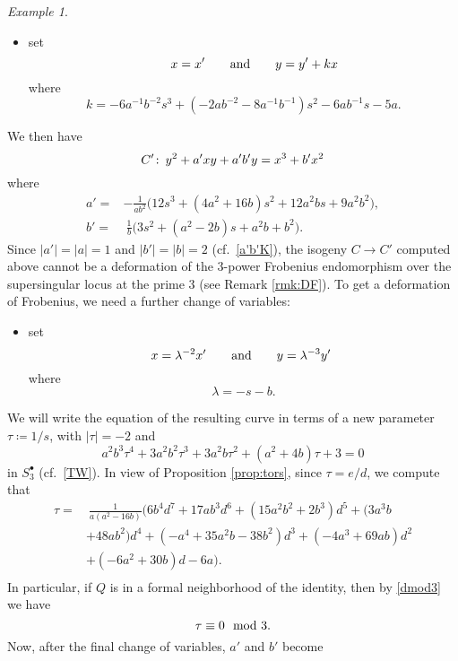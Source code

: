 \documentclass{gtpart}
\theoremstyle{definition}
\theoremstyle{remark}
\newtheorem{ex}[thm]{Example}
\def\co{\colon\thinspace}
\newcommand{\md}{~~{\rm mod}~}
\newcommand{\ad}{{\rm and}}
\newcommand{\T}{\tau}
\newcommand{\s}{S^\bullet}
\newcommand{\ce}{\coloneqq}
\numberwithin{equation}{section}
\numberwithin{thm}{section}
\begin{document}
\begin{ex}
\begin{itemize}
  \item set 
  \[
   \qquad x = x' \qquad \ad \qquad y = y' + k x \thinspace
  \]
  where 
  \[
   k = -6 a^{-1} b^{-2} s^3 + (-2 a b^{-2} - 8 a^{-1} b^{-1}) s^2 
   - 6 a b^{-1} s - 5 a.  
  \]
 \end{itemize}
 We then have 
 \[
  C' \co y^2 + a' x y + a' b' y = x^3 + b' x^2 
 \]
 where 
 \begin{equation*}
 \begin{split}
  a' = & -\frac{1}{a b^2} \big( 12 s^3 + (4 a^2 + 16 b) s^2 + 12 a^2 b s + 9 a^2 b^2 \big), \\
  b' = & ~ \frac{1}{b} \big( 3 s^2 + (a^2 - 2 b) s + a^2 b + b^2 \big).  
 \end{split}
 \end{equation*}
 Since $|a'| = |a| = 1$ and $|b'| = |b| = 2$ (cf.~\eqref{a'b'K}), the 
 isogeny $C \to C'$ computed above cannot be a deformation of the 
 3-power Frobenius endomorphism over the supersingular locus at the 
 prime 3 (see Remark \ref{rmk:DF}).  To get a deformation of Frobenius, 
 we need a further change of variables: 
 \begin{itemize}
  \item set 
  \[
   x = \lambda^{-2} x' \qquad \ad \qquad y = \lambda^{-3} y' ~
  \]
  where 
  \[
   \lambda = -s - b.  
  \]
 \end{itemize}
 We will write the equation of the resulting curve in terms of a new 
 parameter $\T \ce 1/s$, with $|\T| = -2$ and 
 \begin{equation}
 \label{TTW}
  a^2 b^3 \T^4 + 3 a^2 b^2 \T^3 + 3 a^2 b \T^2 + (a^2 + 4 b) \T + 3 = 0 
 \end{equation}
 in $\s_3$ (cf.~\eqref{TW}).  In view of Proposition \ref{prop:tors}, 
 since $\T = e/d$, we compute that 
 \begin{equation}
 \label{T}
 \begin{split}
  \T = & ~ \frac{1}{a (a^2 - 16 b)} \big( 6 b^4 d^7 + 17 a b^3 d^6 + (15 a^2 b^2 + 2 b^3) d^5 + (3 a^3 b \\
       & + 48 a b^2) d^4 + (-a^4 + 35 a^2 b - 38 b^2) d^3 +(-4 a^3 + 69 a b) d^2 \\
       & + (-6 a^2 + 30 b) d - 6 a \big).  \\
 \end{split}
 \end{equation}
 In particular, if $Q$ is in a formal neighborhood of the identity, then 
 by \eqref{dmod3} we have 
 \[
  \T \equiv 0 \md 3.  
 \]
 Now, after the final change of variables, $a'$ and $b'$ become 

\end{ex}
\end{document}
